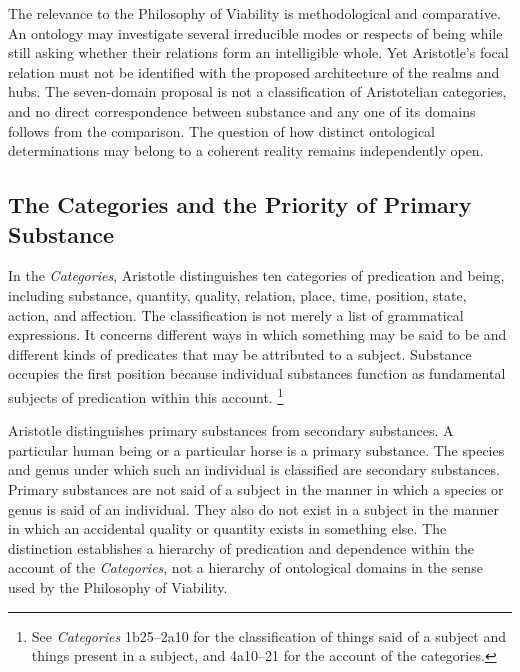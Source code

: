 \label{para:VS.B01.P01.C08.S05.SS02.P004}

The relevance to the Philosophy of Viability is methodological
and comparative. An ontology may investigate several
irreducible modes or respects of being while still asking
whether their relations form an intelligible whole.
Yet Aristotle's focal relation must not be identified
with the proposed architecture of the realms and hubs.
The seven-domain proposal is not a classification of
Aristotelian categories, and no direct correspondence
between substance and any one of its domains follows
from the comparison. The question of how distinct
ontological determinations may belong to a coherent
reality remains independently open.


\subsection{The Categories and the Priority of Primary Substance}

\label{para:VS.B01.P01.C08.S05.SS03.P001}

In the \textit{Categories}, Aristotle distinguishes ten
categories of predication and being, including substance,
quantity, quality, relation, place, time, position, state,
action, and affection. The classification is not merely
a list of grammatical expressions. It concerns different
ways in which something may be said to be and different
kinds of predicates that may be attributed to a subject.
Substance occupies the first position because individual
substances function as fundamental subjects of predication
within this account. \footnote{See \textit{Categories}
1b25--2a10 for the classification of things said of a
subject and things present in a subject, and 4a10--21
for the account of the categories.}

\label{para:VS.B01.P01.C08.S05.SS03.P002}

Aristotle distinguishes primary substances from secondary
substances. A particular human being or a particular
horse is a primary substance. The species and genus
under which such an individual is classified are
secondary substances. Primary substances are not said
of a subject in the manner in which a species or genus
is said of an individual. They also do not exist in
a subject in the manner in which an accidental quality
or quantity exists in something else. The distinction
establishes a hierarchy of predication and dependence
within the account of the \textit{Categories}, not
a hierarchy of ontological domains in the sense used
by the Philosophy of Viability.


